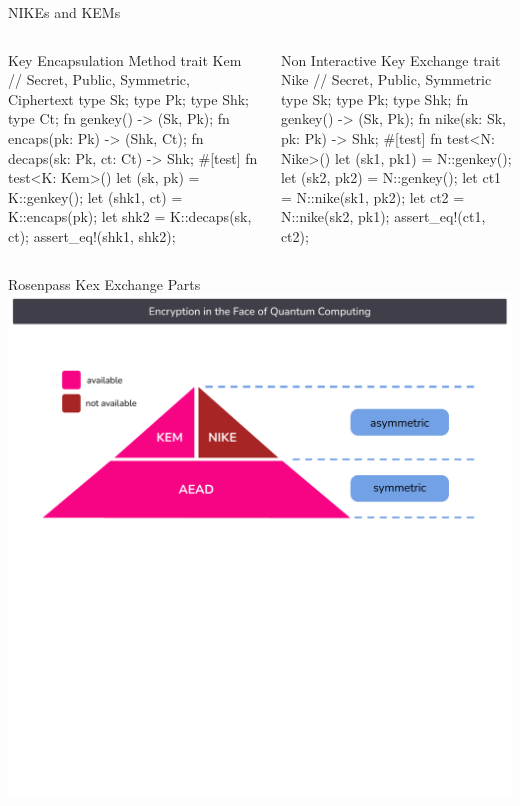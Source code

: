 \begin{frame}[fragile,T]{NIKEs and KEMs}
  \begin{columns}[t,fullwidth]
    \begin{column}{.5\linewidth}
\begin{rustblock}{Key Encapsulation Method}
trait Kem {
  // Secret, Public, Symmetric, Ciphertext
  type Sk; type Pk; type Shk; type Ct;
  fn genkey() -> (Sk, Pk);
  fn encaps(pk: Pk) -> (Shk, Ct);
  fn decaps(sk: Pk, ct: Ct) -> Shk;
}
#[test]
fn test<K: Kem>() {
  let (sk, pk) = K::genkey();
  let (shk1, ct) = K::encaps(pk);
  let shk2 = K::decaps(sk, ct);
  assert_eq!(shk1, shk2);
}
\end{rustblock}
    \end{column}%
    \begin{column}{.5\linewidth}
\begin{rustblock}{Non Interactive Key Exchange}
trait Nike {
  // Secret, Public, Symmetric
  type Sk; type Pk; type Shk;
  fn genkey() -> (Sk, Pk);
  fn nike(sk: Sk, pk: Pk) -> Shk;
}
#[test]
fn test<N: Nike>() {
  let (sk1, pk1) = N::genkey();
  let (sk2, pk2) = N::genkey();
  let ct1 = N::nike(sk1, pk2);
  let ct2 = N::nike(sk2, pk1);
  assert_eq!(ct1, ct2);
}
\end{rustblock}
    \end{column}

  \end{columns}
\end{frame}




\begin{frame}{Rosenpass Kex Exchange Parts}
  \centering
  \includegraphics[width=.9\linewidth,page=6,clip=true,trim=1cm 4cm 0cm 2cm]{graphics/rosenpass-key-exchanges-nike-kem.pdf}
\end{frame}




